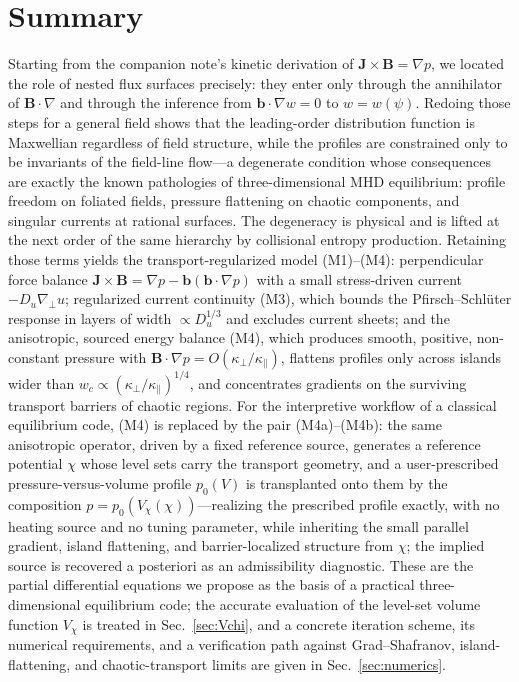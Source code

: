 \documentclass[english]{article}
\newcommand{\bB}{\mathbf{B}}
\newcommand{\bJ}{\mathbf{J}}
\newcommand{\bb}{\mathbf{b}}
\newcommand{\gradperp}{\nabla_{\!\perp}}
\begin{document}
\section{Summary}
\label{sec:summary}

Starting from the companion note's kinetic derivation of $\bJ\times\bB=\nabla p$, we located the
role of nested flux surfaces precisely: they enter only through the annihilator of
$\bB\cdot\nabla$ and through the inference from $\bb\cdot\nabla w=0$ to $w=w(\psi)$. Redoing those
steps for a general field shows that the leading-order distribution function is Maxwellian
regardless of field structure, while the profiles are constrained only to be invariants of the
field-line flow---a degenerate condition whose consequences are exactly the known pathologies of
three-dimensional MHD equilibrium: profile freedom on foliated fields, pressure flattening on
chaotic components, and singular currents at rational surfaces. The degeneracy is physical and is
lifted at the next order of the same hierarchy by collisional entropy production. Retaining those
terms yields the transport-regularized model (M1)--(M4): perpendicular force balance
$\bJ\times\bB=\nabla p-\bb(\bb\cdot\nabla p)$ with a small stress-driven current
$-D_u\gradperp u$; regularized current continuity (M3), which bounds the Pfirsch--Schl\"uter
response in layers of width $\propto D_u^{1/3}$ and excludes current sheets; and the anisotropic,
sourced energy balance (M4), which produces smooth, positive, non-constant pressure with
$\bB\cdot\nabla p=O(\kappa_\perp/\kappa_\parallel)$, flattens profiles only across islands wider
than $w_c\propto(\kappa_\perp/\kappa_\parallel)^{1/4}$, and concentrates gradients on the surviving
transport barriers of chaotic regions. For the interpretive workflow of a classical equilibrium
code, (M4) is replaced by the pair (M4a)--(M4b): the same anisotropic operator, driven by a fixed
reference source, generates a reference potential $\chi$ whose level sets carry the transport
geometry, and a user-prescribed pressure-versus-volume profile $p_0(V)$ is transplanted onto them
by the composition $p=p_0(V_\chi(\chi))$---realizing the prescribed profile exactly, with no
heating source and no tuning parameter, while inheriting the small parallel gradient, island
flattening, and barrier-localized structure from $\chi$; the implied source is recovered a
posteriori as an admissibility diagnostic. These are the partial differential equations we propose
as the basis of a practical three-dimensional equilibrium code; the accurate evaluation of the
level-set volume function $V_\chi$ is treated in Sec.~\ref{sec:Vchi}, and a concrete iteration
scheme, its numerical requirements, and a verification path against Grad--Shafranov,
island-flattening, and chaotic-transport limits are given in Sec.~\ref{sec:numerics}.
\end{document}
